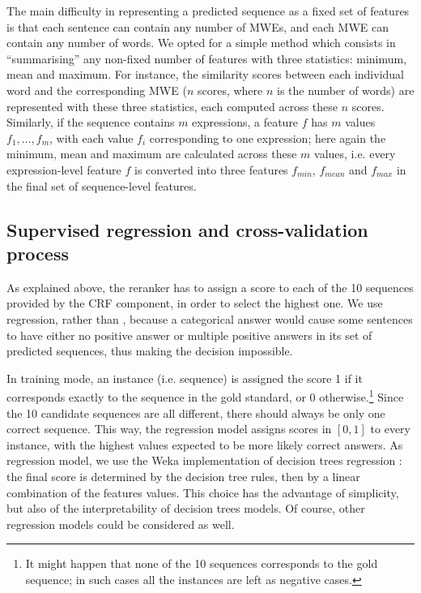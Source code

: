 \documentclass[output=paper,modfonts,nonflat]{langsci/langscibook}
\begin{document}
The main difficulty in representing a predicted sequence as a fixed
set of features is that each sentence can contain any number of MWEs,
and each MWE can contain any number of words. We opted for a simple
method which consists in ``summarising'' any non-fixed number of
features with three statistics: minimum, mean and maximum. For
instance, the similarity scores between each individual word and the
corresponding MWE ($n$ scores, where $n$ is the number of words) are represented
with these three statistics, each computed across these $n$
scores. Similarly, if the sequence contains $m$ expressions, a feature
$f$ has $m$ values $f_1,\dots,f_m$, with each value $f_i$ corresponding to one
expression; here again the minimum, mean and maximum are calculated
across these $m$ values, i.e. every expression-level feature $f$ is
converted into three features $f_{min}$, $f_{mean}$ and $f_{max}$ in
the final set of sequence-level features. 




\subsection{Supervised regression and cross-validation process}

As explained above, the reranker has to assign a score to each of the
10 sequences provided by the CRF component, in order to select the highest
one. We use regression, rather than , because a
categorical answer would cause some sentences to have either no
positive answer or multiple positive answers in its set of predicted
sequences, thus making the decision impossible.

In training mode, an instance (i.e. sequence) is assigned the score 1 if
it corresponds exactly to the sequence in the gold standard, or 0
otherwise.\footnote{It might happen that none of the 10 sequences
  corresponds to the gold sequence; in such cases all the instances
  are left as negative cases.} Since the 10 candidate sequences are
all different, there should always be only one correct sequence. This
way, the regression model assigns scores in $[0,1]$ to every instance,
with the highest values expected to be more likely correct answers.  As
regression model, we use the Weka \citep{hall2009weka} implementation of
decision trees regression \citep{M5P}: the final score is determined
by the decision tree rules, then by a linear combination of the
features values. This choice has the advantage of simplicity, but also
of the interpretability of decision trees models. Of course, other
regression models could be considered as well.
\end{document}
